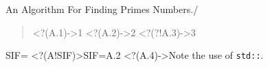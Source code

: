 \documentclass{beamer}
\begin{document}
\begin{frame}{An Algorithm For Finding Primes Numbers.}{\insertframenumber/\insertslidenumber}
\begin{verse}
\ttfamily
\uncover<?(A.1)->{1 }
\uncover<?(A.2)->{2 }
\uncover<?(?!A.3)->{3 }
\end{verse}
\BeanovesDebugOn
\BeanovesLogGProp
{}
  SIF=
  \visible<?(A!SIF)>{SIF=A.2}
  \visible<?(A.4)->{Note the use of \alert{\texttt{std::}}.}
\end{frame}
\end{document}
